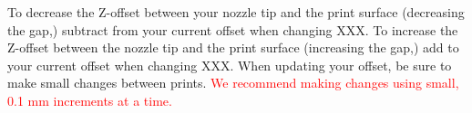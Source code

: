 To decrease the Z-offset between your nozzle tip and the print surface (decreasing the gap,) subtract from your current offset when changing XXX. To increase the Z-offset between the nozzle tip and the print surface (increasing the gap,) add to your current offset when changing XXX. When updating your offset, be sure to make small changes between prints. \textcolor{red}{We recommend making changes using small, 0.1 mm increments at a time.} 






